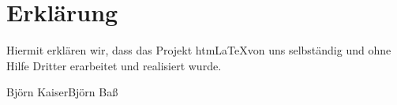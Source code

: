 \documentclass[	a4paper,		%
		titlepage, 		%
		fontsize=12pt		%
		]{scrartcl} 		%
\begin{document}
\newpage
% 
% 

\appendix
\section{Erklärung}
Hiermit erklären wir, dass das Projekt htm\LaTeX von uns selbständig und ohne Hilfe Dritter erarbeitet und realisiert wurde.

\vspace{3cm}
\noindent
\hrulefill \hfill \hrulefill \newline
Björn Kaiser\hfill Björn Baß
\newpage
\newpage	%
\end{document}
